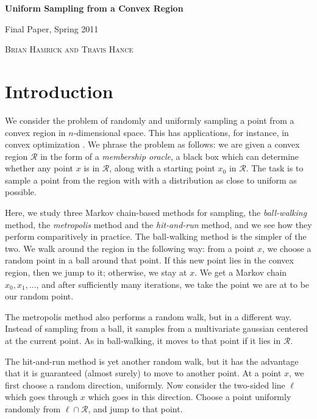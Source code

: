 \documentclass[11pt]{article}
\begin{document}
\begin{center} \begin{LARGE} {\sc \bf Uniform Sampling from a Convex Region} \vspace{6pt}

{ Final Paper, Spring 2011} \vspace{9pt}

\end{LARGE} { \Large \textsc{Brian Hamrick and Travis Hance}}

\end{center}

\section{Introduction}

We consider the problem of randomly and uniformly sampling a point from a convex region in $n$-dimensional space. This has applications, for instance, in convex optimization \cite{Dabbene}. We phrase the problem as follows: we are given a convex region $\mathcal{R}$ in the form of a \emph{membership oracle}, a black box which can determine whether any point $x$ is in $\mathcal{R}$, along with a starting point $x_0$ in $\mathcal{R}$. The task is to sample a point from the region with with a distribution as close to uniform as possible.

Here, we study three Markov chain-based methods for sampling, the \emph{ball-walking} method, the \emph{metropolis} method and the \emph{hit-and-run} method, and we see how they perform comparitively in practice. The ball-walking method is the simpler of the two. We walk around the region in the following way: from a point $x$, we choose a random point in a ball around that point. If this new point lies in the convex region, then we jump to it; otherwise, we stay at $x$. We get a Markov chain $x_0, x_1, ...$, and after sufficiently many iterations, we take the point we are at to be our random point.

The metropolis method also performs a random walk, but in a different way. Instead of sampling from a ball, it samples from a multivariate gaussian centered at the current point. As in ball-walking, it moves to that point if it lies in $\mathcal{R}$.

The hit-and-run method is yet another random walk, but it has the advantage that it is guaranteed (almost surely) to move to another point. At a point $x$, we first choose a random direction, uniformly. Now consider the two-sided line $\ell$ which goes through $x$ which goes in this direction. Choose a point uniformly randomly from $\ell\cap\mathcal{R}$, and jump to that point.
\end{document}

